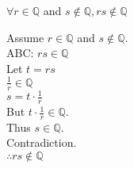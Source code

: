 \documentclass[letterpaper,12pt,fleqn]{article}
\begin{document}
\begin{theorem}
$\forall r\in\mathbb{Q}$ and $s\notin\mathbb{Q},rs\notin\mathbb{Q}$
\end{theorem}

\begin{theproof}
Assume $r\in\mathbb{Q}$ and $s\notin\mathbb{Q}$. \\
ABC: $rs\in\mathbb{Q}$ \\
Let $t=rs$ \\
$\frac{1}{r}\in\mathbb{Q}$ \\
$s=t\cdot\frac{1}{r}$ \\
But $t\cdot\frac{1}{r}\in\mathbb{Q}$. \\
Thus $s\in\mathbb{Q}$. \\
Contradiction. \\
$\therefore rs\notin\mathbb{Q}$
\end{theproof}
\end{document}
